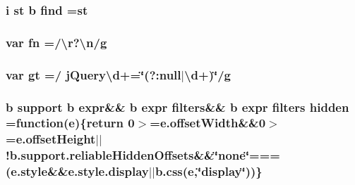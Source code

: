 \hypertarget{jquery-1_89_81_8min_8js_a572df68e1d402c86c9b056706df5cbd1}{
\subsubsection[{find}]{ {\bf i} {\bf st} {\bf b} find ={\bf st}}}\label{jquery-1_89_81_8min_8js_a572df68e1d402c86c9b056706df5cbd1}
\hypertarget{jquery-1_89_81_8min_8js_a37b9e1ceee4c6d2616fa6081784b5468}{
\subsubsection[{fn}]{\setlength{\rightskip}{0pt plus 5cm}var fn =/\textbackslash{}{\bf r}?\textbackslash{}{\bf n}/{\bf g}}}\label{jquery-1_89_81_8min_8js_a37b9e1ceee4c6d2616fa6081784b5468}
\hypertarget{jquery-1_89_81_8min_8js_a945198e4eecf21fb691da06b424939f2}{
\subsubsection[{gt}]{\setlength{\rightskip}{0pt plus 5cm}var gt =/ {\bf j\-Query\textbackslash{}d}+=\char`\"{}(?\-:null$\vert$\textbackslash{}{\bf d}+)\char`\"{}/g}}\label{jquery-1_89_81_8min_8js_a945198e4eecf21fb691da06b424939f2}
\hypertarget{jquery-1_89_81_8min_8js_acf4dc911caeb19a46a155dccb5f28e60}{
\subsubsection[{hidden}]{ {\bf b} support {\bf b} {\bf expr}\&\& {\bf b} {\bf expr} {\bf filters}\&\& {\bf b} {\bf expr} {\bf filters} hidden =function({\bf e})\{return 0$>$=e.\-offset\-Width\&\&0$>$=e.\-offset\-Height$\vert$$\vert$!b.\-support.\-reliable\-Hidden\-Offsets\&\&\char`\"{}none\char`\"{}===(e.\-style\&\&e.\-style.\-display$\vert$$\vert$b.\-css({\bf e},\char`\"{}display\char`\"{}))\}}}\label{jquery-1_89_81_8min_8js_acf4dc911caeb19a46a155dccb5f28e60}
